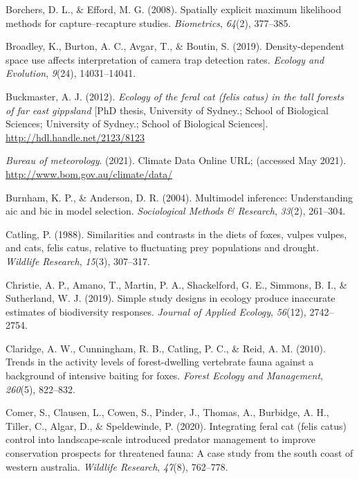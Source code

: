 \documentclass[]{elsarticle} %
\begin{document}
\leavevmode\hypertarget{ref-borchers2008}{}%
Borchers, D. L., \& Efford, M. G. (2008). Spatially explicit maximum likelihood methods for capture--recapture studies. \emph{Biometrics}, \emph{64}(2), 377--385.

\leavevmode\hypertarget{ref-broadley2019}{}%
Broadley, K., Burton, A. C., Avgar, T., \& Boutin, S. (2019). Density-dependent space use affects interpretation of camera trap detection rates. \emph{Ecology and Evolution}, \emph{9}(24), 14031--14041.

\leavevmode\hypertarget{ref-2123-8123}{}%
Buckmaster, A. J. (2012). \emph{Ecology of the feral cat (felis catus) in the tall forests of far east gippsland} {[}PhD thesis, University of Sydney.; School of Biological Sciences; University of Sydney.; School of Biological Sciences{]}. \url{http://hdl.handle.net/2123/8123}

\leavevmode\hypertarget{ref-BOM2021}{}%
\emph{Bureau of meteorology}. (2021). Climate Data Online URL; (accessed May 2021). \url{http://www.bom.gov.au/climate/data/}

\leavevmode\hypertarget{ref-burnham2004}{}%
Burnham, K. P., \& Anderson, D. R. (2004). Multimodel inference: Understanding aic and bic in model selection. \emph{Sociological Methods \& Research}, \emph{33}(2), 261--304.

\leavevmode\hypertarget{ref-catling1988}{}%
Catling, P. (1988). Similarities and contrasts in the diets of foxes, vulpes vulpes, and cats, felis catus, relative to fluctuating prey populations and drought. \emph{Wildlife Research}, \emph{15}(3), 307--317.

\leavevmode\hypertarget{ref-christie2019}{}%
Christie, A. P., Amano, T., Martin, P. A., Shackelford, G. E., Simmons, B. I., \& Sutherland, W. J. (2019). Simple study designs in ecology produce inaccurate estimates of biodiversity responses. \emph{Journal of Applied Ecology}, \emph{56}(12), 2742--2754.

\leavevmode\hypertarget{ref-claridge2010}{}%
Claridge, A. W., Cunningham, R. B., Catling, P. C., \& Reid, A. M. (2010). Trends in the activity levels of forest-dwelling vertebrate fauna against a background of intensive baiting for foxes. \emph{Forest Ecology and Management}, \emph{260}(5), 822--832.

\leavevmode\hypertarget{ref-comer2020integrating}{}%
Comer, S., Clausen, L., Cowen, S., Pinder, J., Thomas, A., Burbidge, A. H., Tiller, C., Algar, D., \& Speldewinde, P. (2020). Integrating feral cat (felis catus) control into landscape-scale introduced predator management to improve conservation prospects for threatened fauna: A case study from the south coast of western australia. \emph{Wildlife Research}, \emph{47}(8), 762--778.
\end{document}
